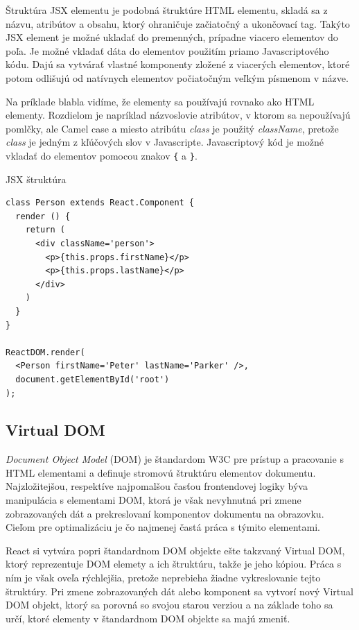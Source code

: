 \documentclass[
  digital, %
  table,   %
  lof,     %
  lot,     %
]{fithesis3}
\begin{document}
Štruktúra JSX elementu je podobná štruktúre HTML elementu, skladá sa z názvu, atribútov a obsahu, ktorý ohraničuje začiatočný a ukončovací tag. Takýto JSX element je možné ukladať do premenných, prípadne viacero elementov do poľa. Je možné vkladať dáta do elementov použitím priamo Javascriptového kódu. Dajú sa vytvárať vlastné komponenty zložené z viacerých elementov, ktoré potom odlišujú od natívnych elementov počiatočným veľkým písmenom v názve.

Na príklade blabla vidíme, že elementy sa používajú rovnako ako HTML elementy. Rozdielom je napríklad názvoslovie atribútov, v ktorom sa nepoužívajú pomlčky, ale Camel case a miesto atribútu \textit{class} je použitý \textit{className}, pretože \textit{class} je jedným z kľúčových slov v Javascripte. Javascriptový kód je možné vkladať do elementov pomocou znakov \texttt{\{} a \texttt{\}}.

\begin{exmp}
JSX štruktúra
\centering
\begin{lstlisting}[basicstyle=\small]
class Person extends React.Component {
  render () {
    return (
      <div className='person'>
        <p>{this.props.firstName}</p>
        <p>{this.props.lastName}</p>
      </div>
    )
  }
}

ReactDOM.render(
  <Person firstName='Peter' lastName='Parker' />,
  document.getElementById('root')
);
\end{lstlisting}
\end{exmp}

\subsection{Virtual DOM}
\textit{Document Object Model} (DOM) je štandardom W3C pre prístup a pracovanie s HTML elementami a definuje stromovú štruktúru elementov dokumentu. Najzložitejšou, respektíve najpomalšou časťou frontendovej logiky býva manipulácia s elementami DOM, ktorá je však nevyhnutná pri zmene zobrazovaných dát a prekreslovaní komponentov dokumentu na obrazovku. Cieľom pre optimalizáciu je čo najmenej častá práca s týmito elementami.

React si vytvára popri štandardnom DOM objekte ešte takzvaný Virtual DOM, ktorý reprezentuje DOM elemety a ich štruktúru, takže je jeho kópiou. Práca s ním je však oveľa rýchlejšia, pretože neprebieha žiadne vykreslovanie tejto štruktúry. Pri zmene zobrazovaných dát alebo komponent sa vytvorí nový Virtual DOM objekt, ktorý sa porovná so svojou starou verziou a na základe toho sa určí, ktoré elementy v štandardnom DOM objekte sa majú zmeniť.
\end{document}
